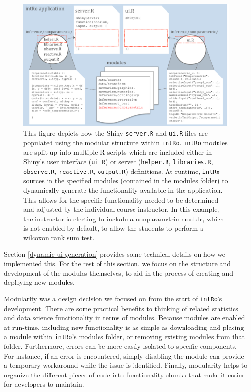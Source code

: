 \documentclass[12pt,]{article}
\begin{document}
\begin{figure}[ht!]
\centering
\includegraphics[width=\linewidth]{images/app_creation_modules.pdf}
\caption{This figure depicts how the Shiny \texttt{server.R} and \texttt{ui.R} files are populated using the modular structure within \texttt{intRo}. \texttt{intRo} modules are split up into multiple R scripts which are included either in Shiny's user interface (\texttt{ui.R}) or server (\texttt{helper.R}, \texttt{libraries.R}, \texttt{observe.R}, \texttt{reactive.R}, \texttt{output.R}) definitions. At runtime, \texttt{intRo} sources in the specified modules (contained in the modules folder) to dynamically generate the functionality available in the application. This allows for the specific functionality needed to be determined and adjusted by the individual course instructor. In this example, the instructor is electing to include a nonparametric module, which is not enabled by default, to allow the students to perform a wilcoxon rank sum test.}
\label{fig:app_creation_modules}
\end{figure}

Section \ref{dynamic-ui-generation} provides some technical details on
how we implemented this. For the rest of this section, we focus on the
structure and development of the modules themselves, to aid in the
process of creating and deploying new modules.

Modularity was a design decision we focused on from the start of
\texttt{intRo}'s development. There are some practical benefits to
thinking of related statistics and data science functionality in terms
of modules. Because modules are enabled at run-time, including new
functionality is as simple as downloading and placing a module within
\texttt{intRo}'s modules folder, or removing existing modules from that
folder. Furthermore, errors can be more easily isolated to specific
components. For instance, if an error is encountered, simply disabling
the module can provide a temporary workaround while the issue is
identified. Finally, modularity helps to organize the different pieces
of code into functionality chunks that make it easier for developers to
maintain.
\end{document}
